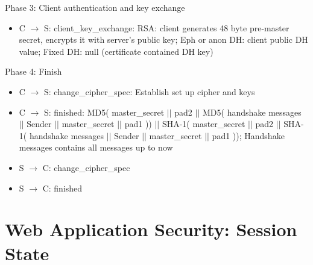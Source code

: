 \documentclass[english, leagacyboxes, nologo]{latex4ei/latex4ei_sheet}
\begin{document}
{  Phase 3:  Client  authentication and key exchange
  \begin{itemize}
  \item C $\rightarrow$ S: client\_key\_exchange: RSA: client generates 48  byte pre-master  secret, encrypts it  with server’s
  public  key; Eph or  anon DH: client  public  DH  value; Fixed DH: null (certificate contained DH  key)
  \end{itemize}

  Phase 4: Finish
  \begin{itemize}
  \item C $\rightarrow$ S: change\_cipher\_spec: Establish set up cipher and keys
  \item C $\rightarrow$ S: finished: MD5( master\_secret $||$ pad2 $||$ MD5( handshake messages $||$ Sender $||$ master\_secret $||$ pad1 )) $||$ SHA-1( master\_secret $||$ pad2 $||$ SHA-1( handshake messages $||$ Sender $||$ master\_secret $||$ pad1 )); Handshake messages contains all messages up to now
  \item S $\rightarrow$ C: change\_cipher\_spec
  \item S $\rightarrow$ C: finished
  \end{itemize}
  }


\section{Web Application Security: Session State}

\end{document}
